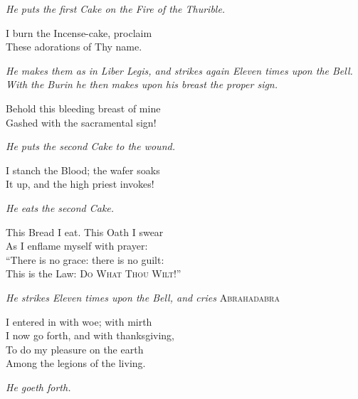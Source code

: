 \textit{He puts the first Cake on the Fire of the Thurible.}

\begin{quoting}[indentfirst=false]
I burn the Incense-cake, proclaim \\
These adorations of Thy name. 
\end{quoting}

\textit{He makes them as in Liber Legis, and strikes again Eleven times upon the Bell. With the Burin he then makes upon his breast the proper sign.}

\begin{quoting}[indentfirst=false]
Behold this bleeding breast of mine \\
Gashed with the sacramental sign! 
\end{quoting}

\textit{He puts the second Cake to the wound.}

\begin{quoting}[indentfirst=false]
I stanch the Blood; the wafer soaks \\
It up, and the high priest invokes!
\end{quoting}

\textit{He eats the second Cake.}

\begin{quoting}[indentfirst=false]
This Bread I eat. This Oath I swear \\
As I enflame myself with prayer: \\
\enquote{There is no grace: there is no guilt: \\
This is the Law: \textsc{Do What Thou Wilt!}}
\end{quoting}

\textit{He strikes Eleven times upon the Bell, and cries} \textsc{Abrahadabra}

\begin{quoting}[indentfirst=false]
I entered in with woe; with mirth \\
I now go forth, and with thanksgiving, \\
To do my pleasure on the earth \\
Among the legions of the living.
\end{quoting}

\textit{He goeth forth.}
